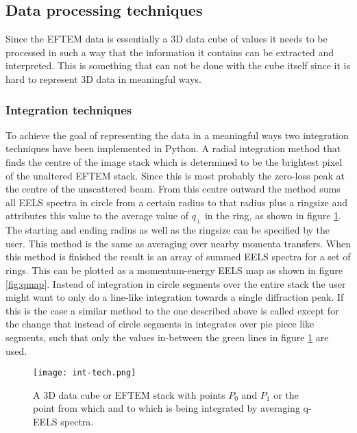 \begin{multicols}{2}
\subsection{Data processing techniques}
Since the EFTEM data is essentially a 3D data cube of values it needs to be processed in such a way that the information it contains can be extracted and interpreted. This is something that can not be done with the cube itself since it is hard to represent 3D data in meaningful ways.\\
%
\subsubsection{Integration techniques}
To achieve the goal of representing the data in a meaningful ways two integration techniques have been implemented in Python.
A radial integration method that finds the centre of the image stack which is determined to be the brightest pixel of the unaltered EFTEM stack. Since this is most probably the zero-loss peak at the centre of the unscattered beam.
From this centre outward the method sums all EELS spectra in circle from a certain radius to that radius plus a ringsize and attributes this value to the average value of $q_{\perp}$ in the ring, as shown in figure \ref{fig:int-tech}.
The starting and ending radius as well as the ringsize can be specified by the user.
This method is the same as averaging over nearby momenta transfers.
When this method is finished the result is an array of summed EELS spectra for a set of rings. This can be plotted as a momentum-energy EELS map as shown in figure \ref{fig:qmap}.
Instead of integration in circle segments over the entire stack the user might want to only do a line-like integration towards a single diffraction peak. If this is the case a similar method to the one described above is called except for the change that instead of circle segments in integrates over pie piece like segments, such that only the values in-between the green lines in figure \ref{fig:int-tech} are used.\\
%
\begin{figure}[H]
	\centering
	\captionsetup{width=0.9\linewidth}
	\texttt{[image: int-tech.png]}
	\caption{A 3D data cube or EFTEM stack with points $P_0$ and $P_1$ or the point from which and to which is being integrated by averaging q-EELS spectra.}
	\label{fig:int-tech}
\end{figure}



\end{multicols}
